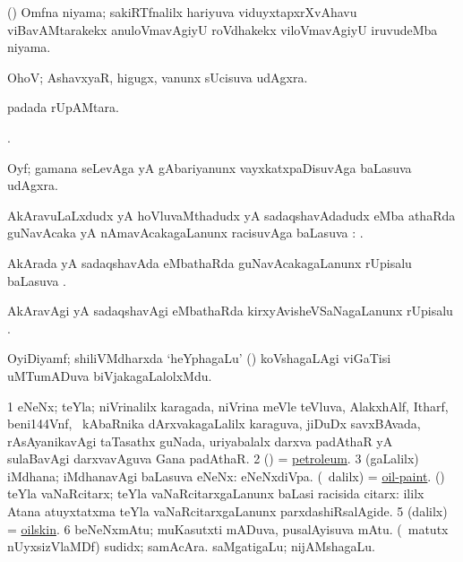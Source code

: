 \bentry
{}
\gl{\nA}
\bmng
(\viduyx) Omfna niyama; sakiRTfnalilx hariyuva viduyxtapxrXvAhavu viBavAMtarakekx anuloVmavAgiyU roVdhakekx viloVmavAgiyU iruvudeMba niyama. 
\emng
\eentry

\bentry
{}
\gl{\BAavayx}
\bmng
OhoV; AshavxyaR, higugx, \mo vanunx sUcisuva udAgxra. 
\emng
\eentry

\bentry
{}
\gl{\BAavayx}
\bmng
{} padada rUpAMtara. 
\emng
\eentry

\bentry
{}
\gl{\saMkiSx}
\bmng
{}. 
\emng
\eentry

\bentry
{}
\gl{\BAavayx}
\bmng
Oyf; gamana seLevAga yA gAbariyanunx vayxkatxpaDisuvAga baLasuva udAgxra. 
\emng
\eentry

\bentry
{}
\gl{\uparx}
\bmng
AkAravuLaLxdudx yA hoVluvaMthadudx yA sadaqshavAdadudx eMba athaRda guNavAcaka yA nAmavAcakagaLanunx racisuvAga baLasuva \uparx: . 
\emng
\eentry

\bentry
{}
\gl{\uparx}
\bmng
AkArada yA sadaqshavAda eMbathaRda guNavAcakagaLanunx rUpisalu baLasuva \uparx. 
\emng
\eentry

\bentry
{}
\gl{\uparx}
\bmng
AkAravAgi yA sadaqshavAgi eMbathaRda kirxyAvisheVSaNagaLanunx rUpisalu \uparx. 
\emng
\eentry

\bentry
{}
\gl{\nA}
\bmng
OyiDiyamf; shiliVMdharxda `heYphagaLu' () koVshagaLAgi viGaTisi uMTumADuva biVjakagaLalolxMdu. 
\emng
\eentry

\bentry
{}
\gl{\nA}
\bmng
\bnum
\num{1} eNeNx; teYla; niVrinalilx karagada, niVrina meVle teVluva, AlakxhAlf, Itharf, beni\char144Vnf, \mo\ kAbaRnika dArxvakagaLalilx karaguva, jiDuDx savxBAvada, rAsAyanikavAgi taTasathx guNada, uriyabalalx darxva padAthaR yA sulaBavAgi darxvavAguva Gana padAthaR. 
\num{2} (\ame) = \hyperref{kandict_p.pdf}{P}{petroleum}{petroleum}. 
\num{3} (\saMpa gaLalilx) iMdhana; iMdhanavAgi baLasuva eNeNx:  eNeNxdiVpa. 
 (\sA\ \bava dalilx) 
\banum
{} = \hyperlink{oil-paint}{oil-paint}. 
 (\AmA) teYla vaNaRcitarx; teYla vaNaRcitarxgaLanunx baLasi racisida citarx:  ililx Atana atuyxtatxma teYla vaNaRcitarxgaLanunx parxdashiRsalAgide. 
\eanum
\numie
\num{5} (\bava dalilx) = \hyperlink{oilskin}{oilskin}. 
\num{6} beNeNxmAtu; muKasutxti mADuva, pusalAyisuva mAtu. 
 (\AseTxrXV\ matutx nUyxsizVlaMDf) 
\banum
{} sudidx; samAcAra. 
 saMgatigaLu; nijAMshagaLu. 
\eanum
\numie
\enum
\emng

